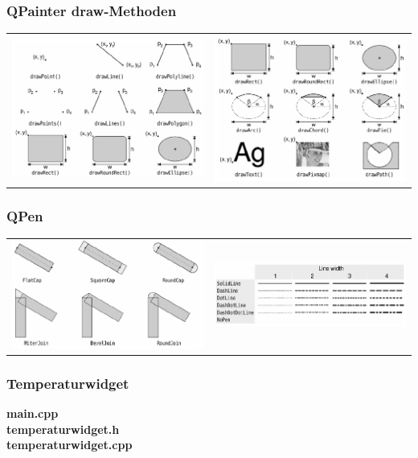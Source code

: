 \subsubsection{QPainter draw-Methoden}
\begin{tabular}{c c}
	\includegraphics[width=9cm]{images/draw_1.png}& \includegraphics[width=9cm]{images/draw_2.png}\\
\end{tabular}
\subsubsection{QPen}
\begin{tabular}{c c}
	\includegraphics[width=9cm]{images/pen_1.png}& \includegraphics[width=9cm]{images/pen_2.png}\\
\end{tabular}
\newpage
\subsubsection{Temperaturwidget}
\textbf{main.cpp}
\\

\textbf{temperaturwidget.h}
\\

\newpage
\textbf{temperaturwidget.cpp}
